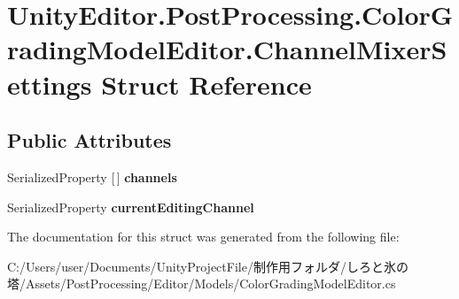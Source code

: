 \hypertarget{struct_unity_editor_1_1_post_processing_1_1_color_grading_model_editor_1_1_channel_mixer_settings}{}\section{Unity\+Editor.\+Post\+Processing.\+Color\+Grading\+Model\+Editor.\+Channel\+Mixer\+Settings Struct Reference}
\label{struct_unity_editor_1_1_post_processing_1_1_color_grading_model_editor_1_1_channel_mixer_settings}
\subsection*{Public Attributes}
\begin{DoxyCompactItemize}
\item 
\mbox{\label{struct_unity_editor_1_1_post_processing_1_1_color_grading_model_editor_1_1_channel_mixer_settings_ae545c88445cdcfe41d9e9ec8d39a4812}} 
Serialized\+Property \mbox{[}$\,$\mbox{]} {\bfseries channels}
\item 
\mbox{\label{struct_unity_editor_1_1_post_processing_1_1_color_grading_model_editor_1_1_channel_mixer_settings_ac1d534e81480c8a0879f07f6a4482a2e}} 
Serialized\+Property {\bfseries current\+Editing\+Channel}
\end{DoxyCompactItemize}


The documentation for this struct was generated from the following file\+:\begin{DoxyCompactItemize}
\item 
C\+:/\+Users/user/\+Documents/\+Unity\+Project\+File/制作用フォルダ/しろと氷の塔/\+Assets/\+Post\+Processing/\+Editor/\+Models/Color\+Grading\+Model\+Editor.\+cs\end{DoxyCompactItemize}
